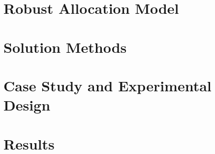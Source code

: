 \documentclass[11pt]{article}
\begin{document}
\section{Robust Allocation Model}\label{sec:model}

\section{Solution Methods}\label{sec:solvers}

\section{Case Study and Experimental Design}\label{sec:casestudy}

\section{Results}\label{sec:results}
\end{document}
